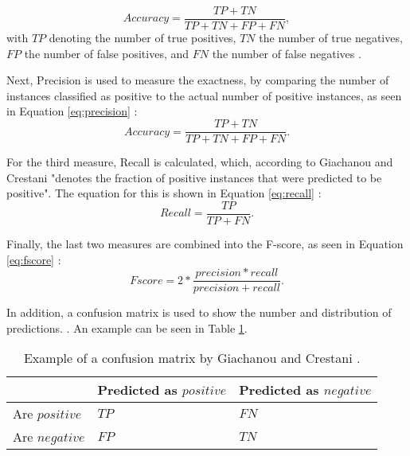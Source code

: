 \begin{equation}
    \label{eq:accuracy}
    Accuracy = \frac{TP + TN}{TP + TN + FP + FN},
\end{equation}
with $TP$ denoting the number of true positives, $TN$ the number of true negatives, $FP$ the number of false positives, and $FN$ the number of false negatives \cite{DBLP:journals/csur/GiachanouC16}.

Next, Precision is used to measure the exactness, by comparing the number of instances classified as positive to the actual number of positive instances, as seen in Equation \eqref{eq:precision} \cite{DBLP:journals/csur/GiachanouC16}:
\begin{equation}
    \label{eq:precision}
    Accuracy = \frac{TP + TN}{TP + TN + FP + FN}.
\end{equation}

For the third measure, Recall is calculated, which, according to Giachanou and Crestani "denotes the fraction of positive instances that were predicted to be positive". The equation for this is shown in Equation \eqref{eq:recall} \cite{DBLP:journals/csur/GiachanouC16}:
\begin{equation}
    \label{eq:recall}
    Recall = \frac{TP}{TP + FN}.
\end{equation}

Finally, the last two measures are combined into the F-score, as seen in Equation \eqref{eq:fscore} \cite{DBLP:journals/csur/GiachanouC16}:
\begin{equation}
    \label{eq:fscore}
    Fscore = 2*\frac{precision * recall}{precision + recall}.
\end{equation}

In addition, a confusion matrix is used to show the number and distribution of predictions. \cite{DBLP:journals/csur/GiachanouC16}. An example can be seen in Table \ref{tab:conf_example}.

\begin{table}[h!]
\centering
\caption{Example of a confusion matrix by Giachanou and Crestani \cite[p.~28:11]{DBLP:journals/csur/GiachanouC16}.}
\begin{tabular}{ |p{3cm}||p{3cm}|p{3cm}| }
 \hline
  &          Predicted as $positive$ &Predicted as $negative$  \\
 \hline
 Are $positive$        & $TP$&            $FN$\\
  \hline
 Are $negative$  &$FP$&                     $TN$\\
 \hline

\end{tabular}
\label{tab:conf_example}
\end{table}


